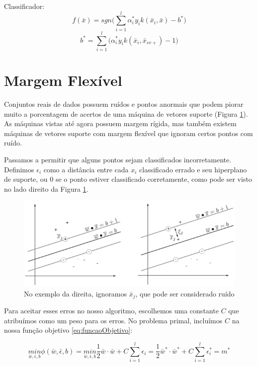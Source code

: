 Classificador:
\begin{equation}
    f(\bar{x}) = sgn\Bigg(
        \sum_{i=1}^{l} \alpha_i^*y_i k(\bar{x}_i,\bar{x})
        -b^*
    \Bigg)
    \label{eq:EQ_Classificador_2}
\end{equation}
\begin{equation}
    b^* = \sum_{i=1}^{l}
    \Bigg(
        \alpha_i^*y_i k(\bar{x}_i,\bar{x}_{sv+})-1
    \Bigg)
    \label{eq:EQ_B_2}
\end{equation}

\section{Margem Flexível}
Conjuntos reais de dados possuem ruídos e pontos anormais que podem piorar muito a porcentagem de acertos de uma máquina de vetores suporte (Figura \ref{fig:LABEL_FIG_6}). As máquinas vistas até agora possuem margem rígida, mas também existem máquinas de vetores suporte com margem flexível que ignoram certos pontos com ruído.

Passamos a permitir que alguns pontos sejam classificados incorretamente. Definimos $\epsilon_i$ como a distância entre cada $x_i$ classificado errado e seu hiperplano de suporte, ou $0$ se o ponto estiver classificado corretamente, como pode ser visto no lado direito da Figura \ref{fig:LABEL_FIG_6}.

\begin{figure}
  \centering
  \includegraphics[width=1\textwidth]{imagens/svm_6.png}
  \caption{No exemplo da direita, ignoramos $\bar{x}_j$, que pode ser considerado ruído \cite{art:LIVRO_SVM}}
  \label{fig:LABEL_FIG_6}
\end{figure}

Para aceitar esses erros no nosso algoritmo, escolhemos uma constante $C$ que atribuímos como um peso para os erros. No problema primal, incluímos $C$ na nossa função objetivo \ref{eq:funcaoObjetivo}:

\begin{equation}
    \underset{\bar{w}, \bar{\epsilon}, b}{min}\phi(\bar{w}, \bar{\epsilon},b)
    = \underset{\bar{w}, \bar{\epsilon}, b}{min}\frac{1}{2}\bar{w}\cdot\bar{w} + C\sum_{i=1}^l \epsilon_i
    = \frac{1}{2}\bar{w}^*\cdot\bar{w}^* + C\sum_{i=1}^l \epsilon_i^*
    =m^*
\end{equation}

